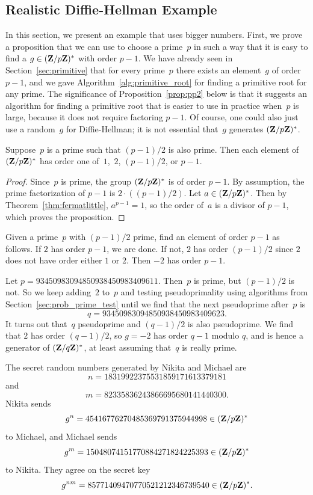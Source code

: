 \subsection{Realistic Diffie-Hellman Example}
In this section, we present an example that uses bigger numbers.
 First, we prove a proposition that we can use to
choose a prime~$p$ in such a way that it is easy to find a
$g\in(\mathbf{Z}/p\mathbf{Z}{})^*$ with order $p-1$.  We have already seen
in Section~\ref{sec:primitive} that for every prime~$p$ there
exists an element~$g$ of order $p-1$, and we gave
Algorithm~\ref{alg:primitive_root} for finding a primitive
root for any prime.  The significance of Proposition~\ref{prop:pp2}
below is that it suggests an algorithm for finding
a primitive root that is easier to use in practice when~$p$
is large, because it does not require factoring $p-1$.
Of course, one could also just use a random~$g$
for Diffie-Hellman; it is not essential that~$g$
generates $(\mathbf{Z}/p\mathbf{Z}{})^*$.

\begin{proposition}\label{prop:pp2}
Suppose~$p$ is a prime such that $(p-1)/2$ is also prime.
Then each element of $(\mathbf{Z}/p\mathbf{Z}{})^*$ has order one of~$1$,~$2$,
$(p-1)/2$, or $p-1$.
\end{proposition}
\begin{proof}
Since~$p$ is prime, the group $(\mathbf{Z}/p\mathbf{Z}{})^*$ is of order
$p-1$.  By assumption, the prime
factorization of $p-1$ is $2\cdot ((p-1)/2)$.  Let $a \in
(\mathbf{Z}/p\mathbf{Z}{})^*$.  Then by Theorem~\ref{thm:fermatlittle}, $a^{p-1}=1$,
so the order of~$a$ is a divisor of $p-1$, which proves the
proposition.
\end{proof}

Given a prime~$p$ with $(p-1)/2$ prime, find an element of
order $p-1$ as follows.  If $2$ has order $p-1$, we are done.
If not, $2$ has order $(p-1)/2$ since $2$ does not have order
either $1$ or $2$.  Then $-2$ has order $p-1$.

Let $p=93450983094850938450983409611$.
Then~$p$ is prime,
but $(p-1)/2$ is not.  So we keep adding~$2$ to~$p$ and
testing pseudoprimality using algorithms from
Section~\ref{sec:prob_prime_test}
until we find that the next pseudoprime after~$p$
is
$$
q=93450983094850938450983409623.
$$
It turns out that~$q$ pseudoprime and $(q-1)/2$ is also pseudoprime.
We find that $2$ has order $(q-1)/2$, so $g=-2$ has
order $q-1$ modulo $q$, and is hence a generator of $(\mathbf{Z}/q\mathbf{Z}{})^*$,
at least assuming that~$q$ is really prime.

The secret
random numbers generated by Nikita and Michael are
$$
  n = 18319922375531859171613379181
$$
and
$$
  m = 82335836243866695680141440300.
$$
Nikita sends
$$
  g^n = 45416776270485369791375944998 \in (\mathbf{Z}/p\mathbf{Z}{})^*
$$
to Michael, and Michael sends
$$
  g^m = 15048074151770884271824225393\in (\mathbf{Z}/p\mathbf{Z}{})^*
$$
to Nikita. They agree on the secret key
$$
 g^{nm} = 85771409470770521212346739540\in (\mathbf{Z}/p\mathbf{Z}{})^*.
$$

